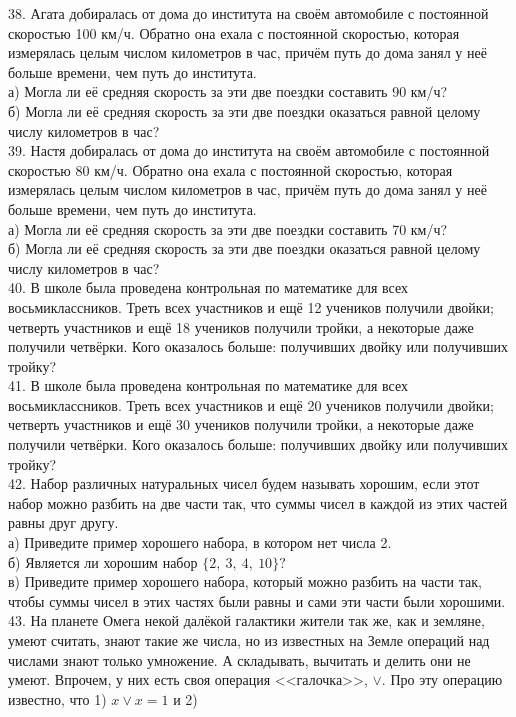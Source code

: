 38. Агата добиралась от дома до института на своём автомобиле с постоянной скоростью 100 км/ч. Обратно она ехала с постоянной скоростью, которая измерялась целым числом километров в час, причём путь до дома занял у неё больше времени, чем путь до института.\\
а) Могла ли её средняя скорость за эти две поездки составить 90 км/ч?\\
б) Могла ли её средняя скорость за эти две поездки оказаться равной целому числу километров в час?\\
39. Настя добиралась от дома до института на своём автомобиле с постоянной скоростью 80 км/ч. Обратно она ехала с постоянной скоростью, которая измерялась целым числом километров в час, причём путь до дома занял у неё больше времени, чем путь до института.\\
а) Могла ли её средняя скорость за эти две поездки составить 70 км/ч?\\
б) Могла ли её средняя скорость за эти две поездки оказаться равной целому числу километров в час?\\
40. В школе была проведена контрольная по математике для всех восьмиклассников. Треть всех участников и ещё 12 учеников получили двойки; четверть участников и ещё 18 учеников получили тройки, а некоторые даже получили четвёрки. Кого оказалось больше: получивших двойку или получивших тройку?\\
41. В школе была проведена контрольная по математике для всех восьмиклассников. Треть всех участников и ещё 20 учеников получили двойки; четверть участников и ещё 30 учеников получили тройки, а некоторые даже получили четвёрки. Кого оказалось больше: получивших двойку или получивших тройку?\\
42. Набор различных натуральных чисел будем называть хорошим, если этот набор можно разбить на две части так, что суммы чисел в каждой из этих частей равны друг другу.\\
а) Приведите пример хорошего набора, в котором нет числа 2.\\
б) Является ли хорошим набор $\{2,\ 3,\ 4,\ 10\}?$\\
в) Приведите пример хорошего набора, который можно разбить на части так, чтобы суммы чисел в этих частях были равны и сами эти части были хорошими.\\
43. На планете Омега некой далёкой галактики жители так же, как и земляне, умеют считать, знают такие же числа, но из известных на Земле операций над числами знают только умножение. А складывать, вычитать и делить они не умеют. Впрочем, у них есть своя операция <<галочка>>, $\vee.$ Про эту операцию известно, что 1) $x\vee x=1$ и 2)
